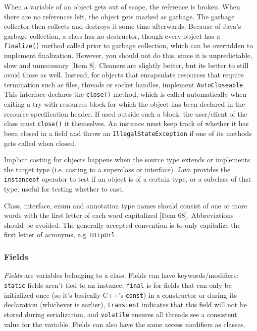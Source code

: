 \documentclass[8pt, table, xcdraw]{article}%
\begin{document}
When a variable of an object gets out of scope, the reference is broken. When there are no references left, the object gets marked as garbage. The garbage collector then collects and destroys it some time afterwards. Because of Java's garbage collection, a class has no destructor, though every object has a \lstinline{finalize()} method called prior to garbage collection, which can be overridden to implement finalization. However, you should not do this, since it is unpredictable, slow and unnecessary [Item 8]. Cleaners are slightly better, but its better to still avoid those as well. Instead, for objects that encapsulate resources that require termination such as files, threads or socket handles, implement \lstinline{AutoCloseable}. This interface declares the \lstinline{close()} method, which is called automatically when exiting a try-with-resources block for which the object has been declared in the resource specification header. If used outside such a block, the user/client of the class must \lstinline{close()} it themselves. An instance must keep track of whether it has been closed in a field and throw an \lstinline{IllegalStateException} if one of its methods gets called when closed.

Implicit casting for objects happens when the source type extends or implements the target type (i.e. casting to a superclass or interface). Java provides the \lstinline{instanceof} operator to test if an object is of a certain type, or a subclass of that type, useful for testing whether to cast.

Class, interface, enum and annotation type names should consist of one or more words with the first letter of each word capitalized [Item 68]. Abbreviations should be avoided. The generally accepted convention is to only capitalize the first letter of acronyms, e.g. \lstinline{HttpUrl}.

\subsubsection{Fields}

\emph{Fields} are variables belonging to a class. Fields can have keywords/modifiers: \lstinline{static} fields aren't tied to an instance, \lstinline{final} is for fields that can only be initialized once (so it's basically C++'s \lstinline{const}) in a constructor or during its declaration (whichever is earlier), \lstinline{transient} indicates that this field will not be stored during serialization, and \lstinline{volatile} ensures all threads see a consistent value for the variable. Fields can also have the same access modifiers as classes.
\end{document}
